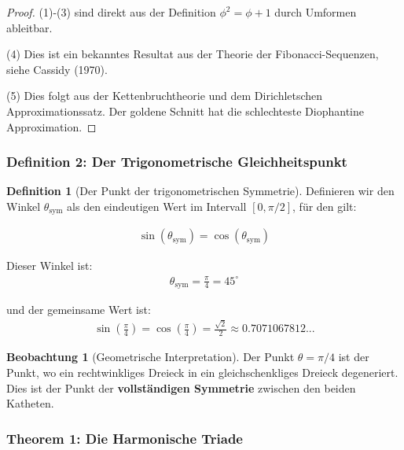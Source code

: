 \documentclass[a4paper, 12pt, twoside, openright]{report}
\theoremstyle{definition}
\newtheorem{definition}[theorem]{Definition}
\newtheorem{beobachtung}{Beobachtung}
\theoremstyle{definition}
\begin{document}
\begin{proof}
(1)-(3) sind direkt aus der Definition $\phi^2 = \phi + 1$ durch Umformen ableitbar.

(4) Dies ist ein bekanntes Resultat aus der Theorie der Fibonacci-Sequenzen, siehe Cassidy (1970).

(5) Dies folgt aus der Kettenbruchtheorie und dem Dirichletschen Approximationssatz. Der goldene Schnitt hat die schlechteste Diophantine Approximation.
\end{proof}

\subsubsection{Definition 2: Der Trigonometrische Gleichheitspunkt}

\begin{definition}[Der Punkt der trigonometrischen Symmetrie]
Definieren wir den Winkel $\theta_{\text{sym}}$ als den eindeutigen Wert im Intervall $[0, \pi/2]$, für den gilt:

\begin{align}
\sin(\theta_{\text{sym}}) = \cos(\theta_{\text{sym}})
\end{align}

Dieser Winkel ist:
\begin{align}
\theta_{\text{sym}} = \frac{\pi}{4} = 45^\circ
\end{align}

und der gemeinsame Wert ist:
\begin{align}
\sin\left(\frac{\pi}{4}\right) = \cos\left(\frac{\pi}{4}\right) = \frac{\sqrt{2}}{2} \approx 0.7071067812...
\end{align}
\end{definition}

\begin{beobachtung}[Geometrische Interpretation]
Der Punkt $\theta = \pi/4$ ist der Punkt, wo ein rechtwinkliges Dreieck in ein gleichschenkliges Dreieck degeneriert. Dies ist der Punkt der \textbf{vollständigen Symmetrie} zwischen den beiden Katheten.
\end{beobachtung}

\subsubsection*{Theorem 1: Die Harmonische Triade}
\end{document}
